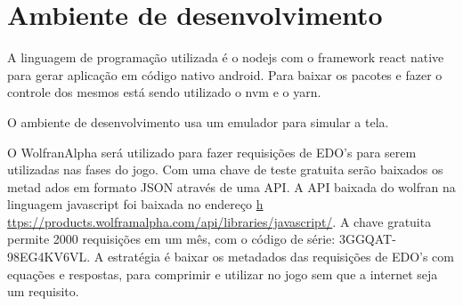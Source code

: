 \section[Ambiente de desenvolvimento]{Ambiente de desenvolvimento}

A linguagem de programação utilizada é o nodejs com o framework react native para gerar aplicação em código nativo android. Para baixar os pacotes e fazer o controle dos mesmos está sendo utilizado o nvm e o yarn.

O ambiente de desenvolvimento usa um emulador para simular a tela.

O WolfranAlpha será utilizado para fazer requisições de EDO's para serem utilizadas nas fases do jogo. Com uma chave de teste gratuita serão baixados os metad    ados em formato JSON através de uma API.
A API baixada do wolfran na linguagem javascript foi baixada no endereço \url{h    ttps://products.wolframalpha.com/api/libraries/javascript/}.
A chave gratuita permite 2000 requisições em um mês, com o código de série: 3GGQAT-98EG4KV6VL. A estratégia é baixar os metadados das requisições de EDO's com     equações e respostas, para comprimir e utilizar no jogo sem que a internet seja um requisito.
